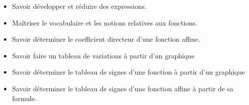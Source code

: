 \documentclass[10pt,a4paper]{article}
\begin{document}

\vspace{-0.3cm}

\begin{prerequis}
\begin{itemize}        
        \item Savoir développer et réduire des expressions.
        \item Maîtriser le vocabulaire et les notions relatives aux fonctions.
        \item Savoir déterminer le coefficient directeur d'une fonction affine.
        \item Savoir faire un tableau de variations à partir d'un graphique
        \item Savoir déterminer le tableau de signes d'une fonction à partir d'un graphique
        \item Savoir déterminer le tableau de signes d'une fonction affine à partir de sa formule.

\end{itemize}

\end{prerequis}
\end{document}
